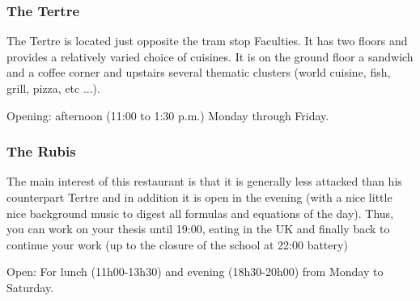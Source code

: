 \subsubsection{The Tertre}


The Tertre is located just opposite the tram stop Faculties. It has two floors and provides a relatively varied choice of cuisines.
It is on the ground floor a sandwich and a coffee corner and upstairs several thematic clusters (world cuisine, fish, grill, pizza, etc ...).

Opening: afternoon (11:00 to 1:30 p.m.) Monday through Friday.
\subsubsection{The Rubis}



The main interest of this restaurant is that it is generally less attacked than his counterpart Tertre and in addition it is open in the evening (with a nice little nice background music to digest all formulas and equations of the day).
Thus, you can work on your thesis until 19:00, eating in the UK and finally back to continue your work (up to the closure of the school at 22:00 battery)

Open: For lunch (11h00-13h30) and evening (18h30-20h00) from Monday to Saturday.


